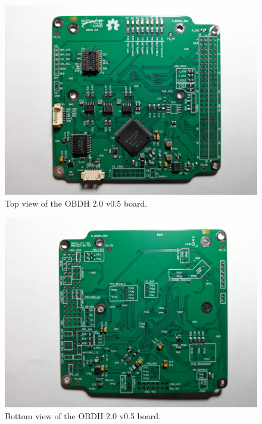 \begin{figure}[!ht]
    \begin{center}
        \includegraphics[width=\columnwidth]{figures/v05/obdh2-v05-top.jpg}
        \caption{Top view of the OBDH 2.0 v0.5 board.}
        \label{fig:obdh2-v05-top}
    \end{center}
\end{figure}

\begin{figure}[!ht]
    \begin{center}
        \includegraphics[width=\columnwidth]{figures/v05/obdh2-v05-bottom.jpg}
        \caption{Bottom view of the OBDH 2.0 v0.5 board.}
        \label{fig:obdh2-v05-bottom}
    \end{center}
\end{figure}

